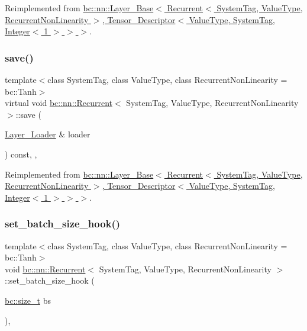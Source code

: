 Reimplemented from \hyperlink{structbc_1_1nn_1_1Layer__Base_a5b3a9854215815f810bef4922b74efaf}{bc\+::nn\+::\+Layer\+\_\+\+Base$<$ Recurrent$<$ System\+Tag, Value\+Type, Recurrent\+Non\+Linearity $>$, Tensor\+\_\+\+Descriptor$<$ Value\+Type, System\+Tag, Integer$<$ 1 $>$ $>$ $>$}.

\mbox{\label{structbc_1_1nn_1_1Recurrent_aef30615b19b63bfc5d965a5799b7ad2c}} 
\subsubsection{\texorpdfstring{save()}{save()}}
{\footnotesize\ttfamily template$<$class System\+Tag, class Value\+Type, class Recurrent\+Non\+Linearity = bc\+::\+Tanh$>$ \\
virtual void \hyperlink{structbc_1_1nn_1_1Recurrent}{bc\+::nn\+::\+Recurrent}$<$ System\+Tag, Value\+Type, Recurrent\+Non\+Linearity $>$\+::save (\begin{DoxyParamCaption}\item[{\hyperlink{structbc_1_1nn_1_1Layer__Loader}{Layer\+\_\+\+Loader} \&}]{loader }\end{DoxyParamCaption}) const\hspace{0.3cm}{\ttfamily [inline]}, {\ttfamily [override]}, {\ttfamily [virtual]}}



Reimplemented from \hyperlink{structbc_1_1nn_1_1Layer__Base_a9613e51db3c27e64ced09e41d2e7f15c}{bc\+::nn\+::\+Layer\+\_\+\+Base$<$ Recurrent$<$ System\+Tag, Value\+Type, Recurrent\+Non\+Linearity $>$, Tensor\+\_\+\+Descriptor$<$ Value\+Type, System\+Tag, Integer$<$ 1 $>$ $>$ $>$}.

\mbox{\label{structbc_1_1nn_1_1Recurrent_a073803232421cd777c05be0362030630}} 
\subsubsection{\texorpdfstring{set\+\_\+batch\+\_\+size\+\_\+hook()}{set\_batch\_size\_hook()}}
{\footnotesize\ttfamily template$<$class System\+Tag, class Value\+Type, class Recurrent\+Non\+Linearity = bc\+::\+Tanh$>$ \\
void \hyperlink{structbc_1_1nn_1_1Recurrent}{bc\+::nn\+::\+Recurrent}$<$ System\+Tag, Value\+Type, Recurrent\+Non\+Linearity $>$\+::set\+\_\+batch\+\_\+size\+\_\+hook (\begin{DoxyParamCaption}\item[{\hyperlink{namespacebc_aaf8e3fbf99b04b1b57c4f80c6f55d3c5}{bc\+::size\+\_\+t}}]{bs }\end{DoxyParamCaption})\hspace{0.3cm}{\ttfamily [inline]}, {\ttfamily [virtual]}}



